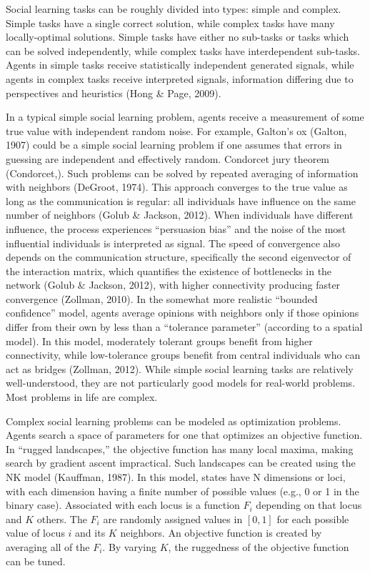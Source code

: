 Social learning tasks can be roughly divided into types: simple and complex. Simple tasks have a single correct solution, while complex tasks have many locally-optimal solutions. Simple tasks have either no sub-tasks or tasks which can be solved independently, while complex tasks have interdependent sub-tasks. Agents in simple tasks receive statistically independent generated signals, while agents in complex tasks receive interpreted signals, information differing due to perspectives and heuristics (Hong \& Page, 2009).

In a typical simple social learning problem, agents receive a measurement of some true value with independent random noise. For example, Galton's ox (Galton, 1907) could be a simple social learning problem if one assumes that errors in guessing are independent and effectively random. Condorcet jury theorem (Condorcet,). Such problems can be solved by repeated averaging of information with neighbors (DeGroot, 1974). This approach converges to the true value as long as the communication is regular: all individuals have influence on the same number of neighbors (Golub \& Jackson, 2012). When individuals have different influence, the process experiences ``persuasion bias'' and the noise of the most influential individuals is interpreted as signal. The speed of convergence also depends on the communication structure, specifically the second eigenvector of the interaction matrix, which quantifies the existence of bottlenecks in the network (Golub \& Jackson, 2012), with higher connectivity producing faster convergence (Zollman, 2010). In the somewhat more realistic ``bounded confidence'' model, agents average opinions with neighbors only if those opinions differ from their own by less than a ``tolerance parameter'' (according to a spatial model). In this model, moderately tolerant groups benefit from higher connectivity, while low-tolerance groups benefit from central individuals who can act as bridges (Zollman, 2012). While simple social learning tasks are relatively well-understood, they are not particularly good models for real-world problems. Most problems in life are complex.

Complex social learning problems can be modeled as optimization problems. Agents search a space of parameters for one that optimizes an objective function. In ``rugged landscapes,'' the objective function has many local maxima, making search by gradient ascent impractical. Such landscapes can be created using the NK model (Kauffman, 1987). In this model, states have N dimensions or loci, with each dimension having a finite number of possible values (e.g., 0 or 1 in the binary case). Associated with each locus is a function $F_i$ depending on that locus and $K$ others. The $F_i$ are randomly assigned values in $[0,1]$ for each possible value of locus $i$ and its $K$ neighbors. An objective function is created by averaging all of the $F_i$. By varying $K$, the ruggedness of the objective function can be tuned.

